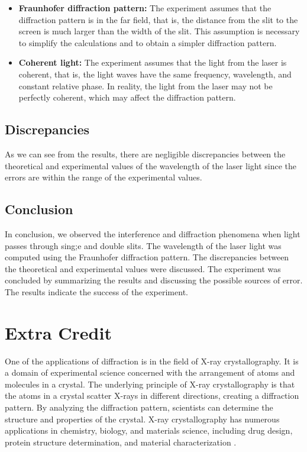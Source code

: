 \documentclass[10pt]{article}
\begin{document}
\begin{itemize}
  \item \textbf{Fraunhofer diffraction pattern:} The experiment assumes that the diffraction pattern is in the far field, that is, the distance from the slit to the screen is much larger than the width of the slit. This assumption is necessary to simplify the calculations and to obtain a simpler diffraction pattern. 
  \item \textbf{Coherent light:} The experiment assumes that the light from the laser is coherent, that is, the light waves have the same frequency, wavelength, and constant relative phase. In reality, the light from the laser may not be perfectly coherent, which may affect the diffraction pattern.
\end{itemize}

\subsection*{Discrepancies}

As we can see from the results, there are negligible discrepancies between the theoretical and experimental values of the wavelength of the laser light since the errors are within the range of the experimental values. 

\subsection*{Conclusion} 

In conclusion, we observed the interference and diffraction phenomena when light passes through sing;e and double slits. The wavelength of the laser light was computed using the Fraunhofer diffraction pattern. The discrepancies between the theoretical and experimental values were discussed. The experiment was concluded by summarizing the results and discussing the possible sources of error. The results indicate the success of the experiment.

\section{Extra Credit}

One of the applications of diffraction is in the field of X-ray crystallography. It is a domain of experimental science concerned with the arrangement of atoms and molecules in a crystal. The underlying principle of X-ray crystallography is that the atoms in a crystal scatter X-rays in different directions, creating a diffraction pattern. By analyzing the diffraction pattern, scientists can determine the structure and properties of the crystal. X-ray crystallography has numerous applications in chemistry, biology, and materials science, including drug design, protein structure determination, and material characterization \cite{Carvalho_2009}.
\end{document}

